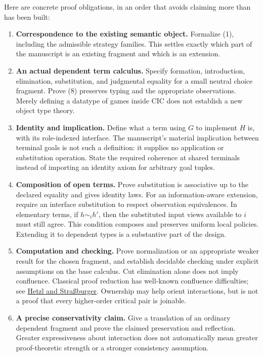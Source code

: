 \documentclass[11pt]{article}
\begin{document}
Here are concrete proof obligations, in an order that avoids claiming more than
has been built:
\begin{enumerate}
\item \textbf{Correspondence to the existing semantic object.} Formalize (1),
      including the admissible strategy families. This settles exactly which
      part of the manuscript is an existing fragment and which is an extension.
\item \textbf{An actual dependent term calculus.} Specify formation, introduction,
      elimination, substitution, and judgmental equality for a small neutral
      choice fragment. Prove (8) preserves typing and the appropriate observations.
      Merely defining a datatype of games inside CIC does not establish a new
      object type theory.
\item \textbf{Identity and implication.} Define what a term using $G$ to implement
      $H$ is, with its role-indexed interface. The manuscript's material implication
      between terminal goals is not such a definition: it supplies no application
      or substitution operation. State the required coherence at shared terminals
      instead of importing an identity axiom for arbitrary goal tuples.
\item \textbf{Composition of open terms.} Prove substitution is associative up to
      the declared equality and gives identity laws. For an information-aware
      extension, require an interface substitution to respect observation
      equivalences. In elementary terms, if $h\sim_i h'$, then the substituted
      input views available to $i$ must still agree. This condition composes and
      preserves uniform local policies. Extending it to dependent types is a
      substantive part of the design.
\item \textbf{Computation and checking.} Prove normalization or an appropriate
      weaker result for the chosen fragment, and establish decidable checking
      under explicit assumptions on the base calculus. Cut elimination alone
      does not imply confluence. Classical proof reduction has well-known
      confluence difficulties; see
      \href{https://drops.dagstuhl.de/entities/document/10.4230/LIPIcs.CSL.2012.320}{Hetzl
      and Stra\ss burger}. Ownership may help orient interactions, but is not a
      proof that every higher-order critical pair is joinable.
\item \textbf{A precise conservativity claim.} Give a translation of an ordinary
      dependent fragment and prove the claimed preservation and reflection.
      Greater expressiveness about interaction does not automatically mean
      greater proof-theoretic strength or a stronger consistency assumption.
\end{enumerate}
\end{document}

